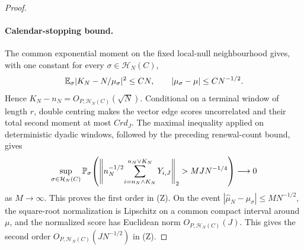 \begin{proof}
\paragraph{Calendar-stopping bound.}
The common exponential moment on the fixed local-null neighbourhood gives,
with one constant for every $\sigma\in\mathcal H_N(C)$,
\[
 \mathbb E_\sigma|K_N-N/\mu_\sigma|^2\leq CN,
 \qquad |\mu_\sigma-\mu|\leq CN^{-1/2}.
\]
Hence $K_N-n_N=O_{P,\mathcal H_N(C)}(\sqrt N)$.  Conditional on a terminal
window of length $r$, double centring makes the vector edge scores
uncorrelated and their total second moment at most $Crd_J$.  The maximal
inequality applied on deterministic dyadic windows, followed by the preceding
renewal-count bound, gives
\[
 \sup_{\sigma\in\mathcal H_N(C)}
 \mathbb P_\sigma\!\left(
  \left\|n_N^{-1/2}\!\sum_{i=n_N\wedge K_N}^{n_N\vee K_N}Y_{i,J}\right\|_2
  >M JN^{-1/4}\right)\longrightarrow0
\]
as $M\to\infty$.  This proves the first order in \textup{(Z)}.  On the event
$|\widehat\mu_N-\mu_\sigma|\leq M N^{-1/2}$, the square-root normalization
is Lipschitz on a common compact interval around $\mu$, and the normalized
score has Euclidean norm $O_{P,\mathcal H_N(C)}(J)$.  This gives the second
order $O_{P,\mathcal H_N(C)}(JN^{-1/2})$ in \textup{(Z)}.


\end{proof}
